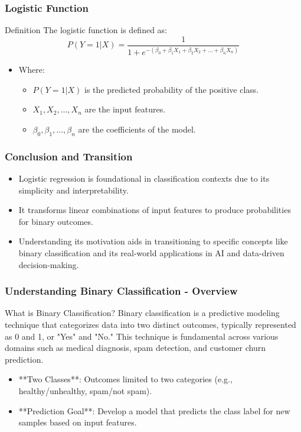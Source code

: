 \documentclass[aspectratio=169]{beamer}
\begin{document}
\begin{frame}[fragile]
    \frametitle{Logistic Function}
    \begin{block}{Definition}
        The logistic function is defined as:
        \begin{equation}
            P(Y=1 | X) = \frac{1}{1 + e^{-(\beta_0 + \beta_1 X_1 + \beta_2 X_2 + \ldots + \beta_n X_n)}}
        \end{equation}
    \end{block}
    \begin{itemize}
        \item Where:
        \begin{itemize}
            \item \( P(Y=1 | X) \) is the predicted probability of the positive class.
            \item \( X_1, X_2, \ldots, X_n \) are the input features.
            \item \( \beta_0, \beta_1, \ldots, \beta_n \) are the coefficients of the model.
        \end{itemize}
    \end{itemize}
\end{frame}

\begin{frame}[fragile]
    \frametitle{Conclusion and Transition}
    \begin{itemize}
        \item Logistic regression is foundational in classification contexts due to its simplicity and interpretability.
        \item It transforms linear combinations of input features to produce probabilities for binary outcomes.
        \item Understanding its motivation aids in transitioning to specific concepts like binary classification and its real-world applications in AI and data-driven decision-making.
    \end{itemize}
\end{frame}

\begin{frame}[fragile]
    \frametitle{Understanding Binary Classification - Overview}
    \begin{block}{What is Binary Classification?}
        Binary classification is a predictive modeling technique that categorizes data into two distinct outcomes, typically represented as 0 and 1, or "Yes" and "No." This technique is fundamental across various domains such as medical diagnosis, spam detection, and customer churn prediction.
    \end{block}
    \begin{itemize}
        \item **Two Classes**: Outcomes limited to two categories (e.g., healthy/unhealthy, spam/not spam).
        \item **Prediction Goal**: Develop a model that predicts the class label for new samples based on input features.
    \end{itemize}
\end{frame}
\end{document}
